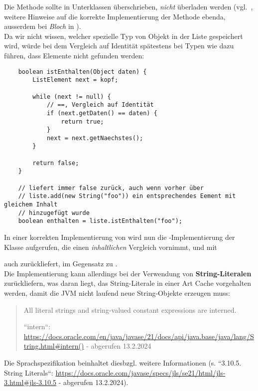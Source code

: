 Die Methode  sollte in Unterklassen überschrieben, \textit{nicht} überladen werden (vgl.~\cite[654]{Ull23}, weitere Hinweise auf die korrekte Implementierung der Methode ebenda, ausserdem bei \textit{Bloch} in \cite[37]{Blo18}).\\

\noindent
Da wir nicht wissen, welcher spezielle Typ von Objekt in der Liste gespeichert wird, würde bei dem Vergleich auf Identität spätestens bei Typen wie  dazu führen, dass Elemente nicht gefunden werden:

\begin{verbatim}
    boolean istEnthalten(Object daten) {
        ListElement next = kopf;

        while (next != null) {
            // ==, Vergleich auf Identität
            if (next.getDaten() == daten) {
                return true;
            }
            next = next.getNaechstes();
        }

        return false;
    }

    // liefert immer false zurück, auch wenn vorher über
    // liste.add(new String("foo")) ein entsprechendes Eement mit gleichem Inhalt
    // hinzugefügt wurde
    boolean enthalten = liste.istEnthalten("foo");
\end{verbatim}

In einer korrekten Implementierung von  wird nun die -Implementierung der Klasse  aufgerufen, die einen \textit{inhaltlichen} Vergleich vornimmt, und mit \begin{center}\end{center} auch  zurückliefert, im Gegensatz zu .\\
Die Implementierung kann allerdings bei der Verwendung von \textbf{String-Literalen}   zurückliefern, was daran liegt, das String-Literale in einer Art Cache vorgehalten werden, damit die JVM nicht laufend neue String-Objekte erzeugen muss:

\blockquote[{``intern``: \url{https://docs.oracle.com/en/java/javase/21/docs/api/java.base/java/lang/String.html#intern()} - abgerufen 13.2.2024}]{
    All literal strings and string-valued constant expressions are interned.
 }

\noindent
Die Sprachspezifikation beinhaltet diesbzgl. weitere Informationen (s. ``3.10.5. String Literals``: \url{https://docs.oracle.com/javase/specs/jls/se21/html/jls-3.html#jls-3.10.5} - abgerufen 13.2.2024).